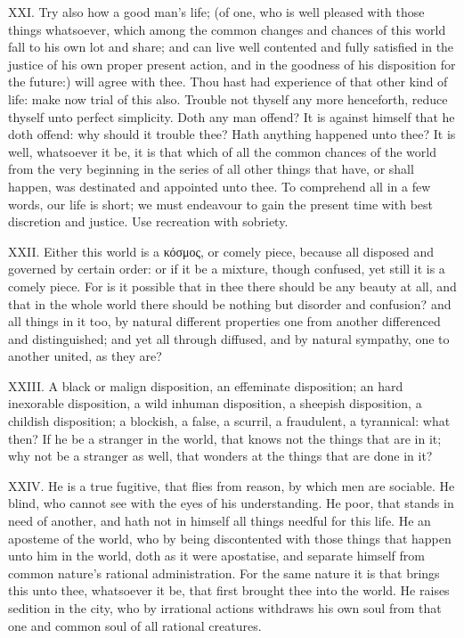XXI. Try also how a good man's life; (of one, who is well pleased with
those things whatsoever, which among the common changes and chances of
this world fall to his own lot and share; and can live well contented and
fully satisfied in the justice of his own proper present action, and in
the goodness of his disposition for the future:) will agree with thee.
Thou hast had experience of that other kind of life: make now trial of
this also. Trouble not thyself any more henceforth, reduce thyself unto
perfect simplicity. Doth any man offend? It is against himself that he
doth offend: why should it trouble thee? Hath anything happened unto thee?
It is well, whatsoever it be, it is that which of all the common chances
of the world from the very beginning in the series of all other things
that have, or shall happen, was destinated and appointed unto thee. To
comprehend all in a few words, our life is short; we must endeavour to
gain the present time with best discretion and justice. Use recreation
with sobriety.

XXII. Either this world is a κόσμος, or
comely piece, because all disposed and governed by certain order: or if
it be a mixture, though confused, yet still it is a comely piece. For is
it possible that in thee there should be any beauty at all, and that in
the whole world there should be nothing but disorder and confusion? and
all things in it too, by natural different properties one from another
differenced and distinguished; and yet all through diffused, and by
natural sympathy, one to another united, as they are?

XXIII. A black or malign disposition, an effeminate disposition; an
hard inexorable disposition, a wild inhuman disposition, a sheepish
disposition, a childish disposition; a blockish, a false, a scurril, a
fraudulent, a tyrannical: what then? If he be a stranger in the world,
that knows not the things that are in it; why not be a stranger as well,
that wonders at the things that are done in it?

XXIV. He is a true fugitive, that flies from reason, by which men are
sociable. He blind, who cannot see with the eyes of his understanding. He
poor, that stands in need of another, and hath not in himself all things
needful for this life. He an aposteme of the world, who by being
discontented with those things that happen unto him in the world, doth as
it were apostatise, and separate himself from common nature's rational
administration. For the same nature it is that brings this unto thee,
whatsoever it be, that first brought thee into the world. He raises
sedition in the city, who by irrational actions withdraws his own soul
from that one and common soul of all rational creatures.

